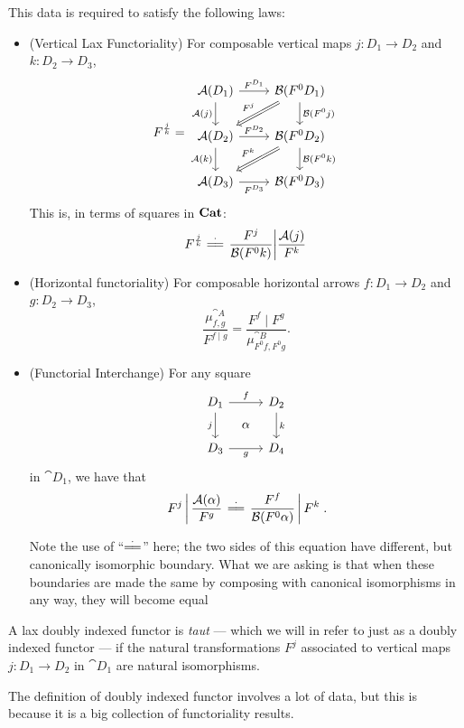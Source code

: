 \documentclass[DynamicalBook]{subfiles}
\begin{document}
\begin{definition}
This data is required to satisfy the following laws:
\begin{itemize}
  \item (Vertical Lax Functoriality) For composable vertical maps $j : D_1 \to D_2$ and $k :
    D_2 \to D_3$, 
\[
F^{\frac{j}{k}} = 
\begin{tikzcd}
  \cat{A}(D_1) \ar[d, "{\cat{A}(j)}"'] \ar[r, "F^{D_1}"] & \cat{B}(F^0D_1)
\ar[dl, Rightarrow, "F^j"']  \ar[d, "\cat{B}(F^0j)"]  \\
\cat{A}(D_2) \ar[d, "{\cat{A}(k)}"']\ar[r,"F^{D_2}"] & \cat{B}(F^0D_2)\ar[d, "\cat{B}(F^0k)"] \ar[dl, Rightarrow, "F^k"'] \\
\cat{A}(D_3) \ar[r,"F^{D_3}"']& \cat{B}(F^0D_3) 
\end{tikzcd}
\]
This is, in terms of squares in $\textbf{Cat}$:
    $$F^{\frac{j}{k}} \coheq \left. \frac{F^j}{\cat{B}(F^0k)} \middle| \frac{\cat{A}(j)}{F^k} \right.$$
  \item (Horizontal functoriality) For composable horizontal arrows $f : D_1 \to
    D_2$ and $g : D_2 \to D_3$, 
$$\frac{\mu^{\cat{A}}_{f, g}}{F^{f \mid g}} = \frac{F^f \mid
  F^g}{\mu^{\cat{B}}_{F^0f, F^0g}}.$$ 
\item (Functorial Interchange) For any square
\[
\begin{tikzcd}[sep=tiny]
D_1 \ar[rr, "f"] \ar[dd, "j"'] & & D_2 \ar[dd, "k"] \\
 & \alpha & \\
D_3 \ar[rr, "g"'] & & D_4
\end{tikzcd}
\]
in $\cat{D}_1$, we have that
\[
  \left. F^j \,\middle|\, \frac{\cat{A}(\alpha)}{F^g} \right. \coheq \left.
    \frac{F^f}{\cat{B}(F^0 \alpha)} \,\middle|\, F^k \right. .
\]

Note the use of ``$\coheq$'' here; the two sides of this equation have
different, but canonically isomorphic boundary. What we are asking is that when these boundaries are made
the same by composing with canonical isomorphisms in any way, they will become
equal

\end{itemize}

A lax doubly indexed functor is \emph{taut} --- which we will in refer to just
as a doubly indexed functor --- if the natural transformations $F^j$ associated
to vertical maps $j : D_1 \to D_2$ in $\cat{D}_1$ are natural isomorphisms.

\end{definition}

The definition of doubly indexed functor involves a lot of data, but this is
because it is a big collection of functoriality results. 
\end{document}
